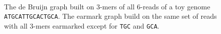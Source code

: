 \documentclass[12pt]{article}
\begin{document}
\begin{figure}
\begin{center}
\\
\end{center}
\caption{ The de Bruijn graph built on $3$-mers 
of all $6$-reads of a toy genome {\tt ATGCATTGCACTGCA}.
 The earmark graph build on the same set of reads with all $3$-mers earmarked except for
{\tt TGC} and {\tt GCA}.}\label{fig:debruijn}
\end{figure}
\end{document}
